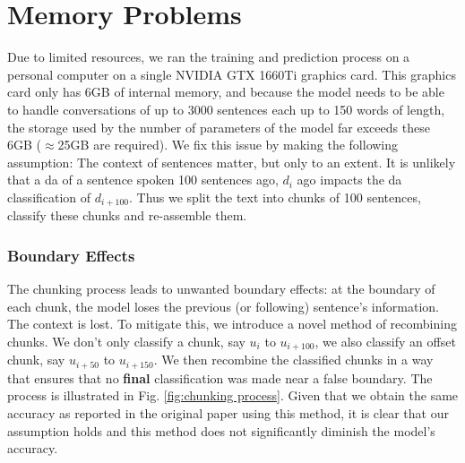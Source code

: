     \section{Memory Problems}
        Due to limited resources, we ran the training and prediction process on a personal computer on a single NVIDIA GTX 1660Ti graphics card. This graphics card only has 6GB of internal memory, and because the \gls{model} needs to be able to handle conversations of up to 3000 sentences each up to 150 words of length, the storage used by the number of parameters of the \gls{model} far exceeds these 6GB ($\approx$25GB are required). We fix this issue by making the following assumption: The context of sentences matter, but only to an extent. It is unlikely that a \gls{da} of a sentence spoken 100 sentences ago, $d_{i}$ ago impacts the \gls{da} classification of  $d_{i + 100}$. Thus we split the text into chunks of 100 sentences, classify these chunks and re-assemble them.

        \subsubsection{Boundary Effects}
            The chunking process leads to unwanted boundary effects: at the boundary of each chunk, the \gls{model} loses the previous (or following) sentence's information. The context is lost. To mitigate this, we introduce a novel method of recombining chunks. We don't only classify a chunk, say $u_{i}$ to $u_{i + 100}$, we also classify an offset chunk, say $u_{i + 50}$ to $u_{i + 150}$. We then recombine the classified chunks in a way that ensures that no \textbf{final} classification was made near a false boundary. The process is illustrated in Fig. \ref{fig:chunking process}. Given that we obtain the same accuracy as reported in the original paper\cite{kumar2017dialogue} using this method, it is clear that our assumption holds and this method does not significantly diminish the \gls{model}'s accuracy.

